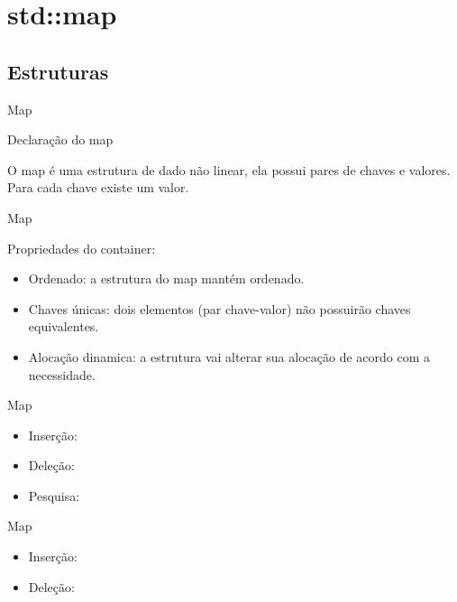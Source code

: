 \section{std::map}

\subsection{Estruturas}

\begin{frame}[fragile]{Map}

    \begin{block}{Declaração do map}
    \end{block}

    O map é uma estrutura de dado não linear, ela possui pares de chaves e valores. Para cada chave existe um valor.

\end{frame}

\begin{frame}[fragile]{Map}

    Propriedades do container:

    \begin{itemize}
        \item Ordenado: a estrutura do map mantém ordenado.
        \item Chaves únicas: dois elementos (par chave-valor) não possuirão chaves equivalentes.
        \item Alocação dinamica: a estrutura vai alterar sua alocação de acordo com a necessidade.
    \end{itemize}


\end{frame}

\begin{frame}[fragile]{Map}

    \begin{itemize}
        \item Inserção:
        \item Deleção: 
        \item Pesquisa: 
    \end{itemize}

\end{frame}

\begin{frame}[fragile]{Map}

    \begin{itemize}
        \item Inserção:
        \item Deleção:
    \end{itemize}

\end{frame}


